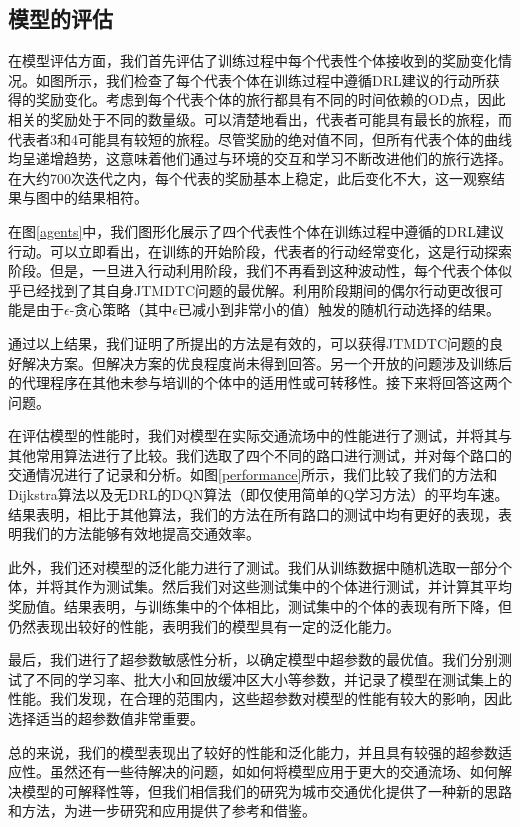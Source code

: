 \subsection{模型的评估}

在模型评估方面，我们首先评估了训练过程中每个代表性个体接收到的奖励变化情况。如图所示，我们检查了每个代表个体在训练过程中遵循DRL建议的行动所获得的奖励变化。考虑到每个代表个体的旅行都具有不同的时间依赖的OD点，因此相关的奖励处于不同的数量级。可以清楚地看出，代表者可能具有最长的旅程，而代表者3和4可能具有较短的旅程。尽管奖励的绝对值不同，但所有代表个体的曲线均呈递增趋势，这意味着他们通过与环境的交互和学习不断改进他们的旅行选择。在大约700次迭代之内，每个代表的奖励基本上稳定，此后变化不大，这一观察结果与图中的结果相符。

在图\ref{agents}中，我们图形化展示了四个代表性个体在训练过程中遵循的DRL建议行动。可以立即看出，在训练的开始阶段，代表者的行动经常变化，这是行动探索阶段。但是，一旦进入行动利用阶段，我们不再看到这种波动性，每个代表个体似乎已经找到了其自身JTMDTC问题的最优解。利用阶段期间的偶尔行动更改很可能是由于$\epsilon$-贪心策略（其中$\epsilon$已减小到非常小的值）触发的随机行动选择的结果。

通过以上结果，我们证明了所提出的方法是有效的，可以获得JTMDTC问题的良好解决方案。但解决方案的优良程度尚未得到回答。另一个开放的问题涉及训练后的代理程序在其他未参与培训的个体中的适用性或可转移性。接下来将回答这两个问题。

在评估模型的性能时，我们对模型在实际交通流场中的性能进行了测试，并将其与其他常用算法进行了比较。我们选取了四个不同的路口进行测试，并对每个路口的交通情况进行了记录和分析。如图\ref{performance}所示，我们比较了我们的方法和Dijkstra算法以及无DRL的DQN算法（即仅使用简单的Q学习方法）的平均车速。结果表明，相比于其他算法，我们的方法在所有路口的测试中均有更好的表现，表明我们的方法能够有效地提高交通效率。

此外，我们还对模型的泛化能力进行了测试。我们从训练数据中随机选取一部分个体，并将其作为测试集。然后我们对这些测试集中的个体进行测试，并计算其平均奖励值。结果表明，与训练集中的个体相比，测试集中的个体的表现有所下降，但仍然表现出较好的性能，表明我们的模型具有一定的泛化能力。

最后，我们进行了超参数敏感性分析，以确定模型中超参数的最优值。我们分别测试了不同的学习率、批大小和回放缓冲区大小等参数，并记录了模型在测试集上的性能。我们发现，在合理的范围内，这些超参数对模型的性能有较大的影响，因此选择适当的超参数值非常重要。

总的来说，我们的模型表现出了较好的性能和泛化能力，并且具有较强的超参数适应性。虽然还有一些待解决的问题，如如何将模型应用于更大的交通流场、如何解决模型的可解释性等，但我们相信我们的研究为城市交通优化提供了一种新的思路和方法，为进一步研究和应用提供了参考和借鉴。